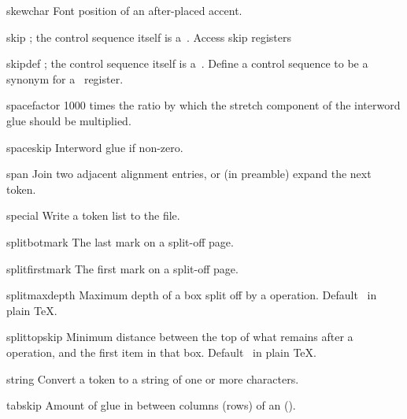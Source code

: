 \item skewchar
      Font position of an after-placed accent.
      
\item skip
      ; the control sequence itself
      is a~.
      Access skip registers

\item skipdef
      ; the control sequence
      itself is a~.
      Define a control sequence to be a synonym for
      a~ register.

\item spacefactor
      1000 times the ratio by which the stretch component of the
      interword glue should be multiplied.

\item spaceskip
      Interword glue if non-zero.

\item span
      Join two adjacent alignment entries, or (in preamble)
      expand the next token.

\item special
      Write a token list  to the  file.

\item splitbotmark
      The last mark on a split-off page.

\item splitfirstmark
      The first mark on a split-off page.

\item splitmaxdepth
      Maximum depth of a box split off by a  operation. 
      Default~\n{4pt} in plain \TeX.

\item splittopskip
      Minimum distance between the top of what remains after a
       operation, and the first item in that box.
      Default~\n{10pt} in plain \TeX.

\item string
      Convert a token to a string of one or more characters. 

\item tabskip
      Amount of glue in between columns (rows) of an 
 \alt
      ().

